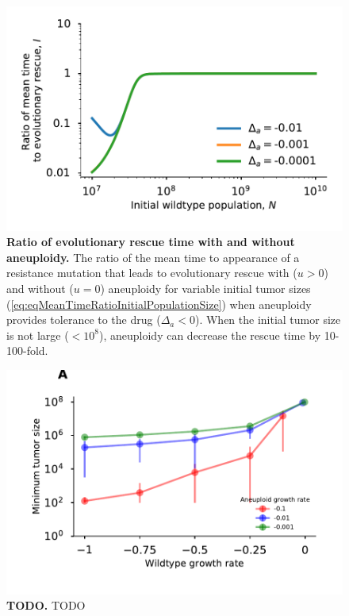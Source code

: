 \documentclass[12pt]{extarticle}
\begin{document}

\begin{figure}
 \vspace*{1\baselineskip}
\includegraphics[width=1\textwidth]{Figures/MeanTimeRatioInitialPopulationSize.pdf}
\caption{\textbf{Ratio of evolutionary rescue time with and without aneuploidy.}
The ratio of the mean time to appearance of a resistance mutation that leads to evolutionary rescue with ($u>0$) and without ($u=0$) aneuploidy for variable initial tumor sizes (\cref{eq:eqMeanTimeRatioInitialPopulationSize}) when aneuploidy provides tolerance to the drug ($\Delta_a < 0$). When the initial tumor size is not large ($<10^8$), aneuploidy can decrease the rescue time by 10-100-fold.
}
\label{MeanTimeRatioInitialPopulationSize}
\end{figure}


\begin{figure}
 \vspace*{1\baselineskip}
\includegraphics[width=1\textwidth]{Figures/ThresholdPopulationSize.pdf}
\caption{\textbf{TODO.}
TODO
}
\label{MinTumorSize}
\end{figure}
\end{document}
